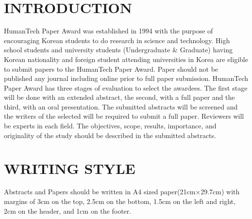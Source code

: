 \documentclass{abstract_hutech}
\begin{document}
\thispagestyle{firstpage}

\section{INTRODUCTION}
HumanTech Paper Award was established in 1994 with the purpose of encouraging Korean students to do research in science and technology. High school students and university students (Undergraduate \& Graduate) having Korean nationality and foreign student attending universities in Korea are eligible to submit papers to the HumanTech Paper Award. Paper should not be published any journal including online prior to full paper submission. HumanTech Paper Award has three stages of evaluation to select the awardees. The first stage will be done with an extended abstract, the second, with a full paper and the third, with an oral presentation. The submitted abstracts will be screened and the writers of the selected will be required to submit a full paper. Reviewers will be experts in each field. The objectives, scope, results, importance, and originality of the study should be described in the submitted abstracts.

\section{WRITING STYLE}
Abstracts and Papers should be written in A4 sized paper(21cm$\times$29.7cm) with margins of 3cm on the top, 2.5cm on the bottom, 1.5cm on the left and right, 2cm on the header, and 1cm on the footer.
\end{document}
